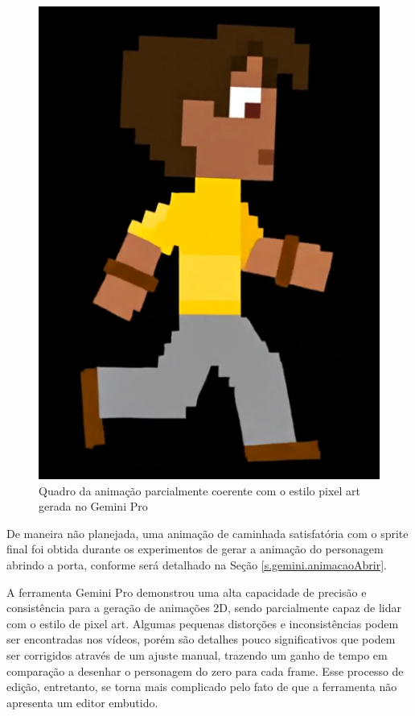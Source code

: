 \begin{figure}[htbp]
    \begin{minipage}{0.45\textwidth}
        \centering
        \caption{\small Quadro da animação parcialmente coerente com o estilo pixel art gerada no Gemini Pro}
        \label{fig:GeminiProAndarCoerencia}
        \includegraphics[width=1\linewidth]{figs/geminiPro/chat7/animacaoParcialmenteCoerente.PNG}
    \end{minipage}
\end{figure}

De maneira não planejada, uma animação de caminhada satisfatória com o sprite final foi obtida durante os experimentos de gerar a animação do personagem abrindo a porta, conforme será detalhado na Seção \ref{s.gemini.animacaoAbrir}.

A ferramenta Gemini Pro demonstrou uma alta capacidade de precisão e consistência para a geração de animações 2D, sendo parcialmente capaz de lidar com o estilo de pixel art. Algumas pequenas distorções e inconsistências podem ser encontradas nos vídeos, porém são detalhes pouco significativos que podem ser corrigidos através de um ajuste manual, trazendo um ganho de tempo em comparação a desenhar o personagem do zero para cada frame. Esse processo de edição, entretanto, se torna mais complicado pelo fato de que a ferramenta não apresenta um editor embutido.

